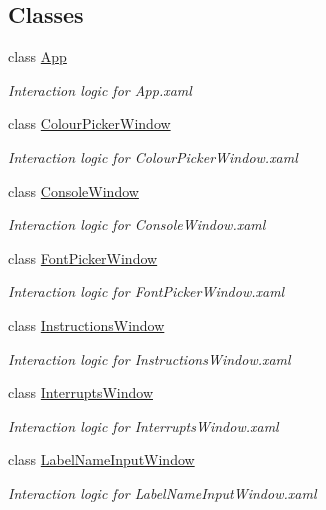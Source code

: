 \subsection*{Classes}
\begin{DoxyCompactItemize}
\item 
class \hyperlink{class_c_p_u___o_s___simulator_1_1_app}{App}
\begin{DoxyCompactList}\small\item\em Interaction logic for App.\+xaml \end{DoxyCompactList}\item 
class \hyperlink{class_c_p_u___o_s___simulator_1_1_colour_picker_window}{Colour\+Picker\+Window}
\begin{DoxyCompactList}\small\item\em Interaction logic for Colour\+Picker\+Window.\+xaml \end{DoxyCompactList}\item 
class \hyperlink{class_c_p_u___o_s___simulator_1_1_console_window}{Console\+Window}
\begin{DoxyCompactList}\small\item\em Interaction logic for Console\+Window.\+xaml \end{DoxyCompactList}\item 
class \hyperlink{class_c_p_u___o_s___simulator_1_1_font_picker_window}{Font\+Picker\+Window}
\begin{DoxyCompactList}\small\item\em Interaction logic for Font\+Picker\+Window.\+xaml \end{DoxyCompactList}\item 
class \hyperlink{class_c_p_u___o_s___simulator_1_1_instructions_window}{Instructions\+Window}
\begin{DoxyCompactList}\small\item\em Interaction logic for Instructions\+Window.\+xaml \end{DoxyCompactList}\item 
class \hyperlink{class_c_p_u___o_s___simulator_1_1_interrupts_window}{Interrupts\+Window}
\begin{DoxyCompactList}\small\item\em Interaction logic for Interrupts\+Window.\+xaml \end{DoxyCompactList}\item 
class \hyperlink{class_c_p_u___o_s___simulator_1_1_label_name_input_window}{Label\+Name\+Input\+Window}
\begin{DoxyCompactList}\small\item\em Interaction logic for Label\+Name\+Input\+Window.\+xaml \end{DoxyCompactList}\item 

\end{DoxyCompactItemize}
